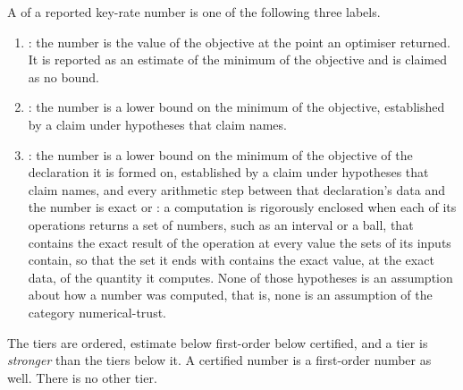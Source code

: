 \begin{definition}\label{def:tiers}
A  of a reported key-rate number is one
of the following three labels.
\begin{enumerate}[label=(\roman*),leftmargin=2.4em]
\item {}: the
  number is the value of the objective at the point
  an optimiser returned. It is reported as an estimate of the minimum of the
  objective and is claimed as no bound.
\item {}: the number is a lower bound on the minimum of the
  objective, established by a claim under hypotheses that claim names.
\item {}: the number is a lower bound on the minimum
  of the objective of the declaration it is formed on, established by a claim
  under hypotheses that claim names, and every arithmetic step between that
  declaration's data and the number is exact or
  : a
  computation is rigorously enclosed when each of its operations returns a
  set of numbers, such as an interval or a ball, that contains the exact
  result of the operation at every value the sets of its inputs contain, so
  that the set it ends with contains the exact value, at the exact data, of
  the quantity it computes. None of those hypotheses is an assumption about
  how a number was computed, that is, none is an assumption of the category
  numerical-trust.
\end{enumerate}
The tiers are ordered, estimate below first-order below certified, and a
tier is \emph{stronger} than the tiers below it. A certified number is a
first-order number as well. There is no other tier.
\end{definition}
